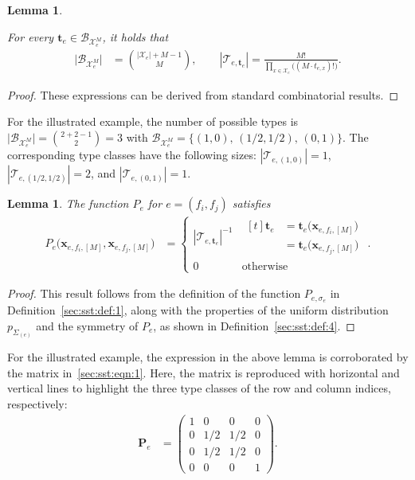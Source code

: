 \documentclass[journal]{IEEEtran}
\newcommand{\add}[1]{{\color{black}#1}}
\newtheorem{lemma}[theorem]{Lemma}
\newcommand{\vect}[1]{ \bm{#1} }
\newcommand{\set}[1]{\mathcal{#1}}
\newcommand{\vx}{ \vect{x} }
\newcommand{\vt}{ \vect{t} }
\newcommand{\matr}[1]{\vect{#1}}
\newcommand{\Sigmae}{\Sigma_{(e)}}
\newcommand{\efi}{ e,f_i }
\newcommand{\efj}{ e,f_j }
\begin{document}
\begin{lemma}
  \label{sec:sst:lem:2}

  \add{For every $\vt_e \in \set{B}_{\set{X}_e^M}$,} it holds that
  \begin{align*}
    \bigl| \set{B}_{\set{X}_e^M} \bigr|
     & = \binom{|\set{X}_e| + M - 1}{M},                                               \qquad
    |\set{T}_{e,\vt_e}|
    = \frac{M!}{ \prod\limits_{x \in \set{X}_e} \bigl( (M \cdot t_{e,x}) ! \bigr) }.
  \end{align*}
\end{lemma}

\begin{proof}
  These expressions can be derived from standard combinatorial results.
\end{proof}

For the illustrated example, the number of possible types is
$\bigl| \set{B}_{\set{X}_e^M} \bigr| = \binom{2 + 2 - 1}{2} = 3$ with
$\set{B}_{\set{X}_e^M} = \bigl\{ (1,0), \, (1/2,1/2), \, (0,1) \bigr\} $. The
corresponding type classes have the following sizes:
$|\set{T}_{e,(1,0)}| = 1$, $|\set{T}_{e,(1/2,1/2)}| = 2$, and
$|\set{T}_{e,(0,1)}| = 1$.

\begin{lemma}\label{sec:sst:lem:4}
  The function $P_e$ for $ e = (f_{i}, f_{j}) $ satisfies
  \begin{align*}
    P_e\bigl( \vx_{\efi,[M]}, \vx_{\efj,[M]} \bigr)
     & = \begin{cases}
           |\set{T}_{e,\vt_e}|^{-1}
            &
           \begin{aligned}[t]
             \vt_e & = \vt_e\bigl(\vx_{\efi,[M]}\bigr)   \\
                   & = \vt_e\bigl( \vx_{\efj,[M]} \bigr)
           \end{aligned} \\
           0
            & \text{otherwise}
         \end{cases}.
  \end{align*}
\end{lemma}

\begin{proof}
  This result follows from the definition of the function $P_{e,\sigma_e}$ in
  Definition~\ref{sec:sst:def:1}, along with the properties of the uniform distribution $p_{\Sigmae}$ and the symmetry of $ P_e $, as shown in Definition~\ref{sec:sst:def:4}.
\end{proof}

For the illustrated example, the expression in the above lemma is
corroborated by the matrix in~\eqref{sec:sst:eqn:1}. Here, the matrix is reproduced with horizontal and vertical lines to highlight the three type classes of the row and column indices, respectively:
\begin{align*}
  \matr{P}_e
   & = \left(
  \begin{array}{c|cc|c}
    1 & 0   & 0   & 0 \\
    \hline
    0 & 1/2 & 1/2 & 0 \\
    0 & 1/2 & 1/2 & 0 \\
    \hline
    0 & 0   & 0   & 1
  \end{array}
  \right).
\end{align*}
\end{document}
